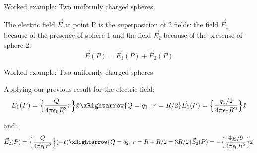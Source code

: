 {\begin{frame}{Worked example: Two uniformly charged spheres}
  \vspace{0.1cm}

  The electric field $\vec{E}$ at point P is the superposition of 2 fields:
  the field $\vec{E}_1$ because of the presence of sphere 1 and
  the field $\vec{E}_2$ because of the presense of sphere 2:
  \begin{equation*}
  	 \vec{E}(P) = \vec{E}_1(P) + \vec{E}_2(P)
  \end{equation*}

\end{frame}

%
%
%

\begin{frame}{Worked example: Two uniformly charged spheres}

  Applying our previous result for the electric field:
  \begin{equation*}
  	\vec{E}_1(P) = \Big\{ \frac{Q}{4 \pi \epsilon_0 R^3} r \Big\} \hat{x} \xRightarrow{Q=q_1, \; r = R/2}
  	\vec{E}_1(P) = \Big\{ \frac{q_1/2}{4 \pi \epsilon_0 R^2} \Big\} \hat{x}
  \end{equation*}


  and:
  \begin{equation*}
  	\vec{E}_2(P) = \Big\{ \frac{Q}{4 \pi \epsilon_0 r^2} \Big\} (-\hat{x}) \xRightarrow{Q=q_2, \; r = R+R/2 = 3R/2}
  	\vec{E}_2(P) = - \Big\{ \frac{4q_2/9}{4 \pi \epsilon_0 R^2} \Big\} \hat{x}
  \end{equation*}



\end{frame}}
